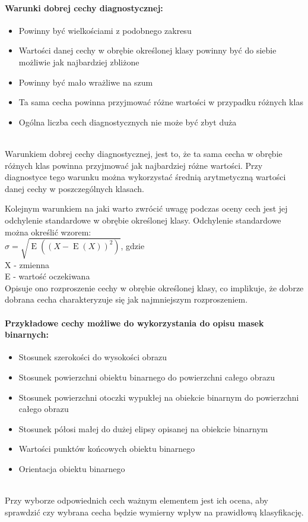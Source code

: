 \documentclass[a4paper,12pt,twoside,openany]{report}
\begin{document}
\paragraph{Warunki dobrej cechy diagnostycznej: }
\begin{itemize}
	\item Powinny być wielkościami z podobnego zakresu
	\item Wartości danej cechy w obrębie określonej klasy powinny być do siebie możliwie jak najbardziej zbliżone
	\item Powinny być mało wrażliwe na szum
	\item Ta sama cecha powinna przyjmować różne wartości w przypadku różnych klas
	\item Ogólna liczba cech diagnostycznych nie może być zbyt duża
\end{itemize}
\mbox{} \\
Warunkiem dobrej cechy diagnostycznej, jest to, że ta sama cecha w obrębie różnych klas powinna przyjmować jak najbardziej różne wartości. Przy diagnostyce tego warunku można wykorzystać średnią arytmetyczną wartości danej cechy w poszczególnych klasach.

Kolejnym warunkiem na jaki warto zwrócić uwagę podczas oceny cech jest jej odchylenie standardowe w obrębie określonej klasy. Odchylenie standardowe można określić wzorem: \\
$ \sigma = {\sqrt {\operatorname {E} ((X-\operatorname {E} (X))^{2})}} $, gdzie \\
X - zmienna \\
E - wartość oczekiwana \\

Opisuje ono rozproszenie cechy w obrębie określonej klasy, co implikuje, że dobrze dobrana cecha charakteryzuje się jak najmniejszym rozproszeniem.

\paragraph{Przykładowe cechy możliwe do wykorzystania do opisu masek binarnych: }
\begin{itemize}
	\item Stosunek szerokości do wysokości obrazu
	\item Stosunek powierzchni obiektu binarnego do powierzchni całego obrazu
	\item Stosunek powierzchni otoczki wypukłej na obiekcie binarnym do powierzchni całego obrazu
	\item Stosunek półosi małej do dużej elipsy opisanej na obiekcie binarnym 
	\item Wartości punktów końcowych obiektu binarnego
	\item Orientacja obiektu binarnego
\end{itemize}
\mbox{} \\
Przy wyborze odpowiednich cech ważnym elementem jest ich ocena, aby sprawdzić czy wybrana cecha będzie wymierny wpływ na prawidłową klasyfikację.
\end{document}
